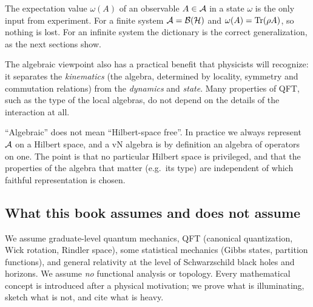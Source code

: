 The expectation value $\omega(A)$ of an observable $A\in\mathcal{A}$ in a state $\omega$ is the only input from experiment. For a finite system $\mathcal{A}=\mathcal{B}(\mathcal{H})$ and $\omega(A)=\operatorname{Tr}(\rho A)$, so nothing is lost. For an infinite system the dictionary is the correct generalization, as the next sections show.

The algebraic viewpoint also has a practical benefit that physicists will recognize: it separates the \emph{kinematics} (the algebra, determined by locality, symmetry and commutation relations) from the \emph{dynamics} and \emph{state}. Many properties of QFT, such as the type of the local algebras, do not depend on the details of the interaction at all.

\begin{whatwrong}
``Algebraic'' does not mean ``Hilbert-space free''. In practice we always represent $\mathcal{A}$ on a Hilbert space, and a vN algebra is by definition an algebra of operators on one. The point is that no particular Hilbert space is privileged, and that the properties of the algebra that matter (e.g.\ its type) are independent of which faithful representation is chosen.
\end{whatwrong}

\subsection{What this book assumes and does not assume}

We assume graduate-level quantum mechanics, QFT (canonical quantization, Wick rotation, Rindler space), some statistical mechanics (Gibbs states, partition functions), and general relativity at the level of Schwarzschild black holes and horizons. We assume \emph{no} functional analysis or topology. Every mathematical concept is introduced after a physical motivation; we prove what is illuminating, sketch what is not, and cite what is heavy.

